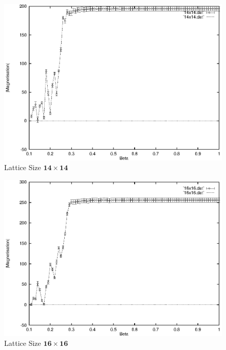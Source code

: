 \documentclass[a4paper]{IEEEtran}
\begin{document}
    \begin{figure} 
    \caption{Lattice Size $\mathbf{14 \times 14}$}
    \label{fig:14x14-2} 
    \begin{center}
        \includegraphics[width=\columnwidth]{14x14_2.eps}
    \end{center}
    \end{figure} 

    \begin{figure} 
    \caption{Lattice Size $\mathbf{16 \times 16}$}
    \label{fig:16x16-2} 
    \begin{center}
        \includegraphics[width=\columnwidth]{16x16_2.eps}
    \end{center}
    \end{figure} 
\end{document}
